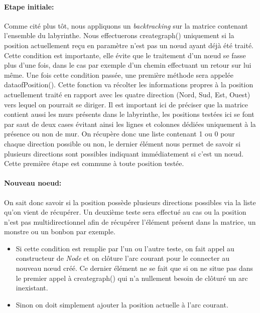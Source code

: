 \documentclass[12pt, oneside]{article}
\begin{document}
\paragraph{Etape initiale:}
Comme cité plus tôt, nous appliquons un \emph{backtracking} sur la matrice contenant l’ensemble du labyrinthe. Nous effectuerons create\textunderscore graph() uniquement si la position actuellement reçu en paramètre n’est pas un nœud ayant déjà été traité. Cette condition est importante, elle évite que le traitement d’un nœud se fasse plus d’une fois, dans le cas par exemple d’un chemin effectuant un retour sur lui même.
Une fois cette condition passée, une première méthode sera appelée data\textunderscore ofPosition(). Cette fonction va récolter les informations propres à la position actuellement traité en rapport avec les quatre direction (Nord, Sud, Est, Ouest) vers lequel on pourrait se diriger. Il est important ici de préciser que la matrice contient aussi les murs présents dans le labyrinthe,  les positions testées ici se font par saut de deux cases évitant ainsi les lignes et colonnes dédiées uniquement à la présence ou non de mur.
On récupère donc une liste contenant 1 ou 0 pour chaque direction possible ou non, le dernier élément nous permet de savoir si plusieurs directions sont possibles indiquant immédiatement si c’est un nœud. 
Cette première étape est commune à toute position testée.

\paragraph{Nouveau noeud:}
On sait donc savoir si la position possède plusieurs directions possibles via la liste qu’on vient de récupérer. Un deuxième teste sera effectué au cas ou la position n’est pas multidirectionnel afin de récupérer l’élément présent dans la matrice, un monstre ou un bonbon par exemple.

\begin{itemize}
\item 
Si cette condition est remplie par l’un ou l’autre teste, on fait appel au constructeur de \emph{Node} et on clôture l’arc courant pour le connecter au nouveau nœud créé. Ce dernier élément ne se fait que si on ne situe pas dans le premier appel à create\textunderscore graph() qui n’a nullement besoin de clôturé un arc inexistant.
\item
Sinon on doit simplement ajouter la position actuelle à l’arc courant.
\end{itemize}
\end{document}
